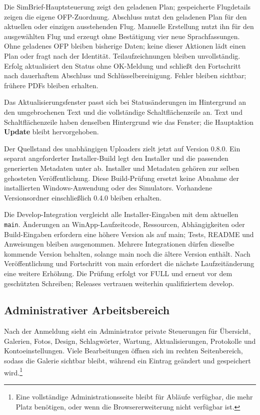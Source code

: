 \documentclass[11pt,a4paper]{article}
\newcommand{\filepath}[1]{\path{#1}}
\newcommand{\ui}[1]{\textbf{#1}}
\begin{document}
Die SimBrief-Hauptsteuerung zeigt den geladenen Plan; gespeicherte Flugdetails
zeigen die eigene OFP-Zuordnung. Abschluss nutzt den geladenen Plan für den
aktuellen oder einzigen ausstehenden Flug. Manuelle Erstellung nutzt ihn für
den ausgewählten Flug und erzeugt ohne Bestätigung vier neue Sprachfassungen.
Ohne geladenes OFP bleiben bisherige Daten; keine dieser Aktionen lädt einen
Plan oder fragt nach der Identität. Teilaufzeichnungen bleiben unvollständig.
Erfolg aktualisiert den Status ohne OK-Meldung und schließt den Fortschritt
nach dauerhaftem Abschluss und Schlüsselbereinigung. Fehler bleiben sichtbar;
frühere PDFs bleiben erhalten.

Das Aktualisierungsfenster passt sich bei Statusänderungen im Hintergrund an
den umgebrochenen Text und die vollständige Schaltflächenzeile an. Text und
Schaltflächenzeile haben denselben Hintergrund wie das Fenster; die Hauptaktion
\ui{Update} bleibt hervorgehoben.

Der Quellstand des unabhängigen Uploaders zielt jetzt auf Version 0.8.0. Ein
separat angeforderter Installer-Build legt den Installer und die passenden
generierten Metadaten \filepath{winapp-update.json} unter
\filepath{winapp/dist/0.8.0/} ab. Installer und Metadaten gehören zur selben
gehosteten Veröffentlichung. Diese Build-Prüfung ersetzt keine Abnahme der
installierten Windows-Anwendung oder des Simulators. Vorhandene Versionsordner
einschließlich 0.4.0 bleiben erhalten.

Die Develop-Integration vergleicht alle Installer-Eingaben mit dem aktuellen
\texttt{main}. Änderungen an WinApp-Laufzeitcode, Ressourcen, Abhängigkeiten
oder Build-Eingaben erfordern eine höhere Version als auf main; Tests, README
und Anweisungen bleiben ausgenommen. Mehrere Integrationen dürfen dieselbe
kommende Version behalten, solange main noch die ältere Version enthält.
Nach Veröffentlichung und Fortschritt von main erfordert die nächste
Laufzeitänderung eine weitere Erhöhung. Die Prüfung erfolgt vor FULL und erneut
vor dem geschützten Schreiben; Releases vertrauen weiterhin qualifiziertem
develop.

\subsection{Administrativer Arbeitsbereich}

Nach der Anmeldung sieht ein Administrator private Steuerungen für Übersicht,
Galerien, Fotos, Design, Schlagwörter, Wartung, Aktualisierungen, Protokolle und
Kontoeinstellungen. Viele Bearbeitungen öffnen sich im rechten Seitenbereich,
sodass die Galerie sichtbar bleibt, während ein Eintrag geändert und gespeichert
wird.\footnote{Eine vollständige Administrationsseite bleibt für Abläufe
verfügbar, die mehr Platz benötigen, oder wenn die Browsererweiterung nicht
verfügbar ist.}
\end{document}
